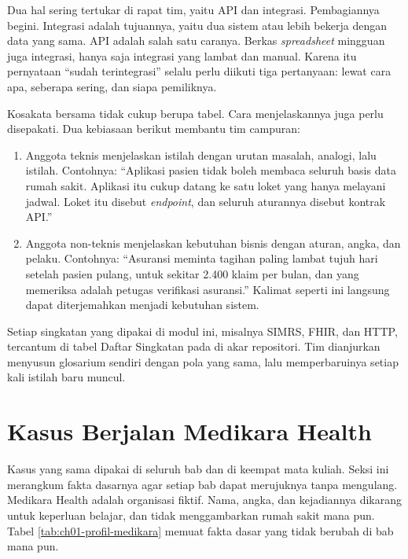 Dua hal sering tertukar di rapat tim, yaitu API dan integrasi. Pembagiannya
begini. Integrasi adalah tujuannya, yaitu dua sistem atau lebih bekerja dengan
data yang sama. API adalah salah satu caranya. Berkas \textit{spreadsheet}
mingguan juga integrasi, hanya saja integrasi yang lambat dan manual. Karena itu
pernyataan ``sudah terintegrasi'' selalu perlu diikuti tiga pertanyaan: lewat cara
apa, seberapa sering, dan siapa pemiliknya.

Kosakata bersama tidak cukup berupa tabel. Cara menjelaskannya juga perlu
disepakati. Dua kebiasaan berikut membantu tim campuran:

\begin{enumerate}
  \item Anggota teknis menjelaskan istilah dengan urutan masalah, analogi, lalu
        istilah. Contohnya: ``Aplikasi pasien tidak boleh membaca seluruh basis
        data rumah sakit. Aplikasi itu cukup datang ke satu loket yang hanya
        melayani jadwal. Loket itu disebut \textit{endpoint}, dan seluruh
        aturannya disebut kontrak API.''
  \item Anggota non-teknis menjelaskan kebutuhan bisnis dengan aturan, angka, dan
        pelaku. Contohnya: ``Asuransi meminta tagihan paling lambat tujuh hari
        setelah pasien pulang, untuk sekitar 2.400 klaim per bulan, dan yang
        memeriksa adalah petugas verifikasi asuransi.'' Kalimat seperti ini
        langsung dapat diterjemahkan menjadi kebutuhan sistem.
\end{enumerate}

Setiap singkatan yang dipakai di modul ini, misalnya SIMRS, FHIR, dan HTTP,
tercantum di tabel Daftar Singkatan pada  di akar repositori.
Tim dianjurkan menyusun glosarium sendiri dengan pola yang sama, lalu
memperbaruinya setiap kali istilah baru muncul.

\section{Kasus Berjalan Medikara Health}

Kasus yang sama dipakai di seluruh bab dan di keempat mata kuliah. Seksi ini
merangkum fakta dasarnya agar setiap bab dapat merujuknya tanpa mengulang.
Medikara Health adalah organisasi fiktif. Nama, angka, dan kejadiannya dikarang
untuk keperluan belajar, dan tidak menggambarkan rumah sakit mana pun. Tabel
\ref{tab:ch01-profil-medikara} memuat fakta dasar yang tidak berubah di bab mana
pun.

